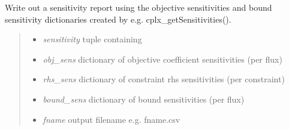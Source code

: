 \documentclass[a4paper,11pt,english]{sphinxmanual}
\begin{document}

\begin{fulllineitems}
\label{modules_doc:cbmpy.CBWrite.writeSensitivitiesToCSV}
Write out a sensitivity report using the objective sensitivities and
bound sensitivity dictionaries created by e.g. cplx\_getSensitivities().
\begin{quote}
\begin{itemize}
\item {} 
\emph{sensitivity} tuple containing

\end{itemize}
\begin{itemize}
\item {} 
\emph{obj\_sens} dictionary of objective coefficient sensitivities (per flux)

\item {} 
\emph{rhs\_sens} dictionary of constraint rhs sensitivities (per constraint)

\item {} 
\emph{bound\_sens} dictionary of bound sensitivities (per flux)

\end{itemize}
\begin{itemize}
\item {} 
\emph{fname} output filename e.g. fname.csv

\end{itemize}
\end{quote}

\end{fulllineitems}

\end{document}
